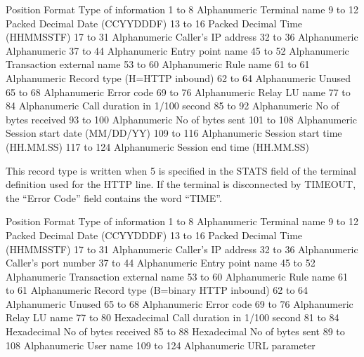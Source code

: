 \documentclass[letterpaper,10pt,english]{sphinxmanual}
\begin{document}
\begin{sphinxVerbatim}[commandchars=\\\{\}]
Position        Format          Type of information
1 to 8          Alphanumeric    Terminal name
9 to 12         Packed Decimal  Date (CCYYDDDF)
13 to 16        Packed Decimal  Time (HHMMSSTF)
17 to 31        Alphanumeric    Caller’s IP address
32 to 36        Alphanumeric    Alphanumeric
37 to 44        Alphanumeric    Entry point name
45 to 52        Alphanumeric    Transaction external name
53 to 60        Alphanumeric    Rule name
61 to 61        Alphanumeric    Record type (H=HTTP inbound)
62 to 64        Alphanumeric    Unused
65 to 68        Alphanumeric    Error code
69 to 76        Alphanumeric    Relay LU name
77 to 84        Alphanumeric    Call duration in 1/100 second
85 to 92        Alphanumeric    No of bytes received
93 to 100       Alphanumeric    No of bytes sent
101 to 108      Alphanumeric    Session start date (MM/DD/YY)
109 to 116      Alphanumeric    Session start time (HH.MM.SS)
117 to 124      Alphanumeric    Session end time (HH.MM.SS)
\end{sphinxVerbatim}

\sphinxAtStartPar
{}

\sphinxAtStartPar
This record type is written when 5 is specified in the STATS field of the terminal definition used for the HTTP line. If the terminal is disconnected by TIMEOUT, the “Error Code” field contains the word     “TIME”.

\begin{sphinxVerbatim}[commandchars=\\\{\}]
Position        Format          Type of information
1 to 8          Alphanumeric    Terminal name
9 to 12         Packed Decimal  Date (CCYYDDDF)
13 to 16        Packed Decimal  Time (HHMMSSTF)
17 to 31        Alphanumeric    Caller’s IP address
32 to 36        Alphanumeric    Caller’s port number
37 to 44        Alphanumeric    Entry point name
45 to 52        Alphanumeric    Transaction external name
53 to 60        Alphanumeric    Rule name
61 to 61        Alphanumeric    Record type (B=binary HTTP inbound)
62 to 64        Alphanumeric    Unused
65 to 68        Alphanumeric    Error code
69 to 76        Alphanumeric    Relay LU name
77 to 80        Hexadecimal     Call duration in 1/100 second
81 to 84        Hexadecimal     No of bytes received
85 to 88        Hexadecimal     No of bytes sent
89 to 108       Alphanumeric    User name
109 to 124      Alphanumeric    URL parameter
\end{sphinxVerbatim}
\end{document}
